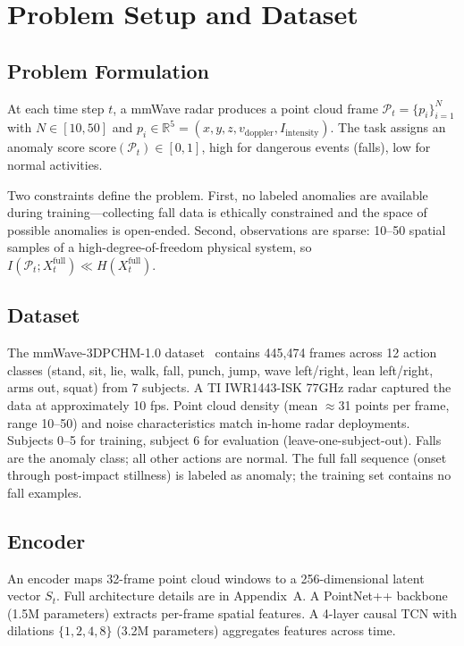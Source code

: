 \documentclass[11pt,a4paper]{article}
\begin{document}
\section{Problem Setup and Dataset}

\subsection{Problem Formulation}

At each time step $t$, a mmWave radar produces a point cloud frame $\mathcal{P}_t = \{p_i\}_{i=1}^{N}$ with $N \in [10, 50]$ and $p_i \in \mathbb{R}^5 = (x, y, z, v_{\text{doppler}}, I_{\text{intensity}})$.
The task assigns an anomaly score $\text{score}(\mathcal{P}_t) \in [0, 1]$, high for dangerous events (falls), low for normal activities.

Two constraints define the problem.
First, no labeled anomalies are available during training---collecting fall data is ethically constrained and the space of possible anomalies is open-ended.
Second, observations are sparse: 10--50 spatial samples of a high-degree-of-freedom physical system, so $I(\mathcal{P}_t; X_t^{\text{full}}) \ll H(X_t^{\text{full}})$.

\subsection{Dataset}

The mmWave-3DPCHM-1.0 dataset~\cite{3dpchm2025} contains 445,474 frames across 12 action classes (stand, sit, lie, walk, fall, punch, jump, wave left/right, lean left/right, arms out, squat) from 7 subjects.
A TI IWR1443-ISK 77GHz radar captured the data at approximately 10 fps.
Point cloud density (mean $\approx$31 points per frame, range 10--50) and noise characteristics match in-home radar deployments.
Subjects 0--5 for training, subject 6 for evaluation (leave-one-subject-out).
Falls are the anomaly class; all other actions are normal.
The full fall sequence (onset through post-impact stillness) is labeled as anomaly; the training set contains no fall examples.

\subsection{Encoder}

An encoder maps 32-frame point cloud windows to a 256-dimensional latent vector $S_t$.
Full architecture details are in Appendix~A.
A PointNet++ backbone~\cite{qi2017pointnetplusplus} (1.5M parameters) extracts per-frame spatial features.
A 4-layer causal TCN with dilations $\{1,2,4,8\}$ (3.2M parameters) aggregates features across time.
\end{document}
